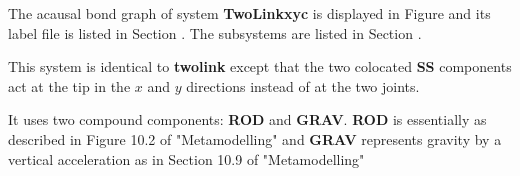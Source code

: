 
%

   The acausal bond graph of system \textbf{TwoLinkxyc} is
   displayed in Figure  and its label
   file is listed in Section .
   The subsystems are listed in Section .

This system is identical to  \textbf{twolink} except that the two
colocated {\bf SS} components act at the tip in the $x$ and $y$
directions instead of at the two joints.

It uses two compound components: {\bf ROD} and {\bf GRAV}.  {\bf ROD}
is essentially as described in Figure 10.2 of "Metamodelling" and {\bf
GRAV} represents gravity by a vertical acceleration as in Section
10.9 of "Metamodelling"

